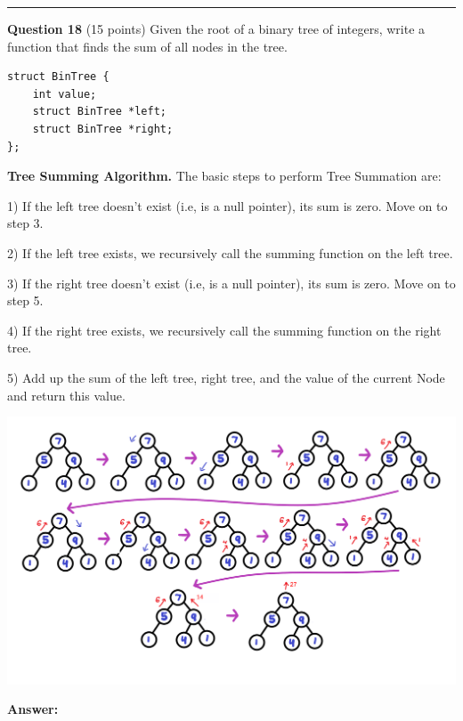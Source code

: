 \documentclass{exam}
\begin{document}
\begin{center}\noindent\rule{6in}{0.4pt}\end{center}

\textbf{Question 18} (15 points) Given the root of a binary tree of integers, write a function that finds the sum of all nodes in the tree.

\begin{lstlisting}
struct BinTree {
	int value;
	struct BinTree *left;
	struct BinTree *right;
};
\end{lstlisting}

\textbf{Tree Summing Algorithm.} The basic steps to perform Tree Summation are:

1) If the left tree doesn't exist (i.e, is a null pointer), its sum is zero. Move on to step 3.

2) If the left tree exists, we recursively call the summing function on the left tree.

3) If the right tree doesn't exist (i.e, is a null pointer), its sum is zero. Move on to step 5.

4) If the right tree exists, we recursively call the summing function on the right tree.

5) Add up the sum of the left tree, right tree, and the value of the current Node and return this value.

\includegraphics[scale=0.2]{tree}

\textbf{Answer:}

\newpage



\end{document}
